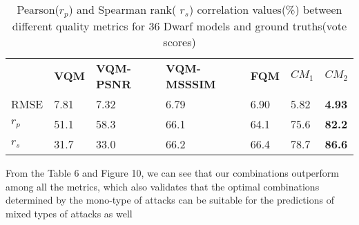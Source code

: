 \begin{table}[]
\centering
\caption{Pearson($r_p$) and Spearman rank( $r_s$) correlation values(\%) between different quality metrics for 36 Dwarf models and ground truths(vote scores)}
\label{my-label}
\begin{tabular}{lllllll}
              & \textbf{VQM} & \textbf{VQM-PSNR} & \textbf{VQM-MSSSIM} & \textbf{FQM}  \cite{Tian_2004} & $CM_1$ & $CM_2$  \\
RMSE &       7.81       &         7.32          &          6.79           &     6.90         &       5.82       &     \textbf{4.93}          \\
$r_p$            & 51.1        & 58.3              & 66.1                & 64.1         & 75.6         & \textbf{82.2} \\
$r_s$           & 31.7         & 33.0              & 66.2               & 66.4         & 78.7         & \textbf{86.6}
\end{tabular}
\end{table}
From the Table 6 and Figure 10, we can see that our combinations outperform among all the metrics, which also validates that the optimal combinations determined by the mono-type of attacks can be suitable for  the predictions of mixed types of attacks as well